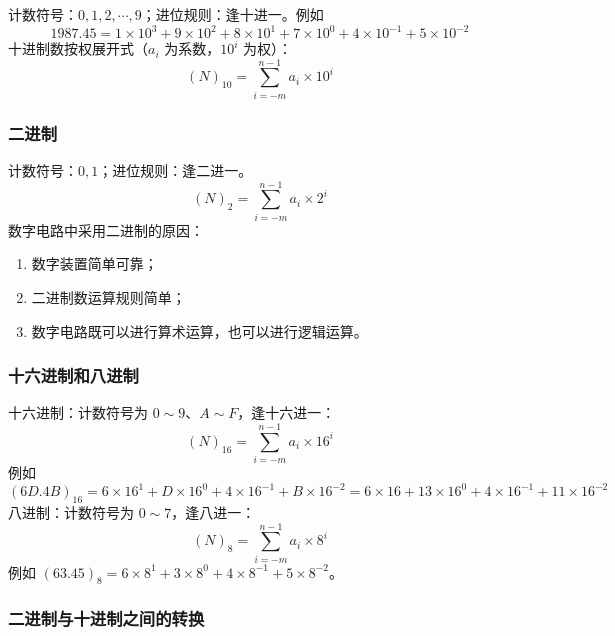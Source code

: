 计数符号：$0,1,2,\cdots,9$；进位规则：逢十进一。例如
\begin{equation}
	1987.45=1\times10^{3}+9\times10^{2}+8\times10^{1}+7\times10^{0}+4\times10^{-1}+5\times10^{-2}
	\label{eq:数制:十进制展开}
\end{equation}
十进制数按权展开式（$a_i$ 为系数，$10^{i}$ 为权）：
\begin{equation}
	(N)_{10}=\sum_{i=-m}^{n-1}a_i\times10^{i}
	\label{eq:数制:十进制按权展开}
\end{equation}

\subsubsection{二进制}

计数符号：$0,1$；进位规则：逢二进一。
\begin{equation}
	(N)_{2}=\sum_{i=-m}^{n-1}a_i\times2^{i}
	\label{eq:数制:二进制按权展开}
\end{equation}
数字电路中采用二进制的原因：
\begin{enumerate}
	\item 数字装置简单可靠；
	\item 二进制数运算规则简单；
	\item 数字电路既可以进行算术运算，也可以进行逻辑运算。
\end{enumerate}

\subsubsection{十六进制和八进制}

十六进制：计数符号为 $0\sim9$、$A\sim F$，逢十六进一：
\begin{equation}
	(N)_{16}=\sum_{i=-m}^{n-1}a_i\times16^{i}
	\label{eq:数制:十六进制按权展开}
\end{equation}
例如
\begin{equation}
	(6D.4B)_{16}=6\times16^{1}+D\times16^{0}+4\times16^{-1}+B\times16^{-2}
	=6\times16+13\times16^{0}+4\times16^{-1}+11\times16^{-2}
	\label{eq:数制:十六进制展开例}
\end{equation}
八进制：计数符号为 $0\sim7$，逢八进一：
\begin{equation}
	(N)_{8}=\sum_{i=-m}^{n-1}a_i\times8^{i}
	\label{eq:数制:八进制按权展开}
\end{equation}
例如 $(63.45)_{8}=6\times8^{1}+3\times8^{0}+4\times8^{-1}+5\times8^{-2}$。

\subsubsection{二进制与十进制之间的转换}

